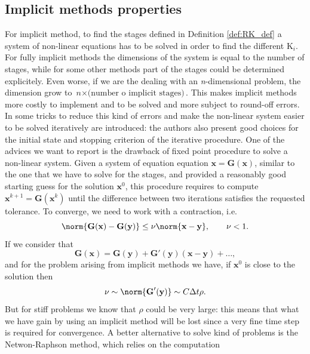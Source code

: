 \documentclass[a4paper,11pt ]{report}
\theoremstyle{definition}
\begin{document}
\subsection{Implicit methods properties}
For implicit method, to find the stages defined in Definition \ref{def:RK_def} a system of non-linear equations has to be solved in order to find the different $\text{K}_i$. For fully implicit methods the dimensions of the system is equal to the number of stages, while for some other methods part of the stages could be determined explicitely. Even worse, if we are the dealing with an \textit{n}-dimensional problem, the dimension grow to $\textit{n}\times \text{(number o implicit stages)}$. This makes implicit methods more costly to implement and to be solved and more subject to round-off errors.
In \cite{Hairer_1} some tricks to reduce this kind of errors and make the non-linear system easier to be solved iteratively are introduced: the authors also present good choices for the initial state and  stopping criterion of the iterative procedure. One of the advices we want to report is the drawback of fixed point procedure to solve a non-linear system. Given a system of equation equation $\textbf{x}=\textbf{G}(\textbf{x})$, similar to the one that we have to solve for the stages, and provided a reasonably good starting guess for the solution $\textbf{x}^0$, this procedure requires to compute $\textbf{x}^{k+1}=\textbf{G}(\textbf{x}^k)$ until the difference between two iterations satisfies the requested tolerance. To converge, we need to work with a contraction, i.e.
\begin{equation*}
\norm{\textbf{G}(\textbf{x})-\textbf{G}(\textbf{y})}\leq \nu \norm{\textbf{x}-\textbf{y}}, \qquad 	\nu<1.
\end{equation*} 
If we consider that 
\begin{equation*}
\textbf{G}(\textbf{x})=\textbf{G}(\textbf{y})+\textbf{G}'(\textbf{y})(\textbf{x}-\textbf{y})+\dots ,
\end{equation*}
and for the problem arising from implicit methods we have, if $\textbf{x}^0$ is close to the solution then
\begin{equation*}
\nu \sim \norm{\textbf{G}'(\textbf{y})}\sim C \Delta t \rho.
\end{equation*}
But for stiff problems we know that $\rho$ could be very large: this means that what we have gain by using an implicit method will be lost since a very fine time step is required for convergence.
A better alternative to solve kind of problems is the Netwon-Raphson method, which relies on the computation %
\end{document}
